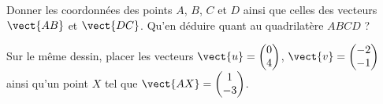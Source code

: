
\begin{exercice}\label{exosmath-0590}

    Donner les coordonnées des points \( A\), \( B\), \( C\) et \( D\) ainsi que celles des vecteurs \( \vect{ AB }\) et \( \vect{ DC }\). Qu'en déduire quant au quadrilatère \( ABCD\) ?

    \begin{center}
   
    \end{center}

    Sur le même dessin, placer les vecteurs \( \vect{ u }=\begin{pmatrix}
        0    \\ 
        4    
    \end{pmatrix}\), \( \vect{ v }=\begin{pmatrix}
        -2    \\ 
        -1    
    \end{pmatrix}\) ainsi qu'un point \( X\) tel que \( \vect{ AX }=\begin{pmatrix}
        1    \\ 
        -3    
    \end{pmatrix}\).

\end{exercice}
